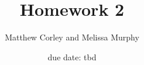 
         \newcommand\alg[1]{\ensuremath{\mathbf{#1}}}
         \newcommand{\<}{\ensuremath{\langle}}
         \renewcommand{\>}{\ensuremath{\rangle}}
         \newcommand\fld[1]{\ensuremath{\mathbb{#1}}}
         \newcommand\Z{\fld{Z}}
         \newcommand\GF{\ensuremath{\operatorname{GF}}}
         \author{Matthew Corley and Melissa Murphy}
         \title{Homework 2}
         \date{due date: tbd}



\maketitle


\newcommand\join{\ensuremath{\vee}}
\newcommand\meet{\ensuremath{\wedge}}

